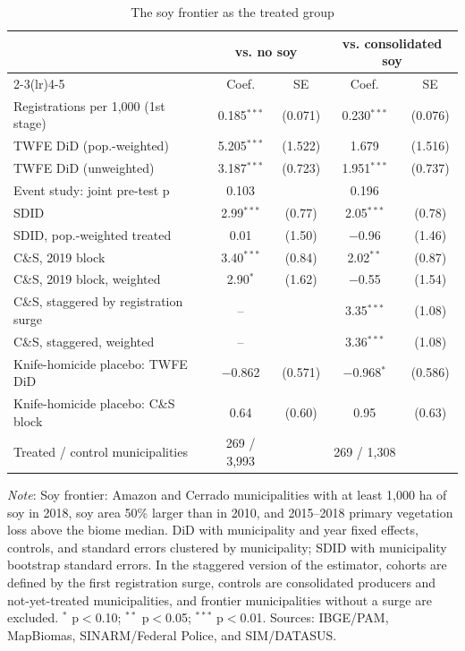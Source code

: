 \documentclass[11pt,a4paper]{article}
\newcommand{\nota}[1]{\par\vspace{2pt}\begin{minipage}{\linewidth}\footnotesize\textit{Note}: #1\end{minipage}}
\begin{document}
\begin{table}[H]
\centering\footnotesize\setlength{\tabcolsep}{4pt}
\caption{The soy frontier as the treated group}\label{tab:soja}
\begin{tabular}{lcccc}
\toprule
 & \multicolumn{2}{c}{vs. no soy} & \multicolumn{2}{c}{vs. consolidated soy} \\
\cmidrule(lr){2-3}\cmidrule(lr){4-5}
 & Coef. & SE & Coef. & SE \\
\midrule
Registrations per 1,000 (1st stage) & 0.185$^{***}$ & (0.071) & 0.230$^{***}$ & (0.076) \\
TWFE DiD (pop.-weighted) & 5.205$^{***}$ & (1.522) & 1.679 & (1.516) \\
TWFE DiD (unweighted) & 3.187$^{***}$ & (0.723) & 1.951$^{***}$ & (0.737) \\
Event study: joint pre-test p & 0.103 &  & 0.196 &  \\
SDID & 2.99$^{***}$ & (0.77) & 2.05$^{***}$ & (0.78) \\
SDID, pop.-weighted treated & 0.01 & (1.50) & $-$0.96 & (1.46) \\
C\&S, 2019 block & 3.40$^{***}$ & (0.84) & 2.02$^{**}$ & (0.87) \\
C\&S, 2019 block, weighted & 2.90$^{*}$ & (1.62) & $-$0.55 & (1.54) \\
C\&S, staggered by registration surge & -- &  & 3.35$^{***}$ & (1.08) \\
C\&S, staggered, weighted & -- &  & 3.36$^{***}$ & (1.08) \\
\midrule
Knife-homicide placebo: TWFE DiD & $-$0.862 & (0.571) & $-$0.968$^{*}$ & (0.586) \\
Knife-homicide placebo: C\&S block & 0.64 & (0.60) & 0.95 & (0.63) \\
\midrule
Treated / control municipalities & 269 / 3,993 &  & 269 / 1,308 &  \\
\bottomrule
\end{tabular}
\nota{Soy frontier: Amazon and Cerrado municipalities with at least 1,000 ha of soy in 2018, soy area 50\% larger than in 2010, and 2015--2018 primary vegetation loss above the biome median. DiD with municipality and year fixed effects, controls, and standard errors clustered by municipality; SDID with municipality bootstrap standard errors. In the staggered version of the \citet{callaway2021} estimator, cohorts are defined by the first registration surge, controls are consolidated producers and not-yet-treated municipalities, and frontier municipalities without a surge are excluded. $^{*}$ p$<$0.10; $^{**}$ p$<$0.05; $^{***}$ p$<$0.01. Sources: IBGE/PAM, MapBiomas, SINARM/Federal Police, and SIM/DATASUS.}
\end{table}
\end{document}
